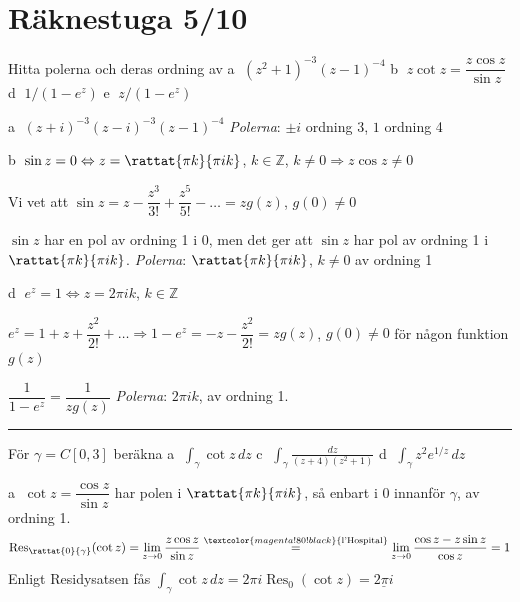 \section{Räknestuga 5/10}

 \quad Hitta polerna och deras ordning av \quad \textcircled{a} $(z^2 + 1)^{-3}(z - 1)^{-4}$ \quad \textcircled{b} $z \cot z = \dfrac{z \cos z}{\sin z}$ \quad \textcircled{d} $1/(1 - e^z)$ \quad \textcircled{e} $z/(1 - e^z)$

\textcircled{a} $(z + i)^{-3}(z - i)^{-3}(z - 1)^{-4}$ \quad \emph{Polerna}: $\pm i$ ordning 3, $1$ ordning 4

\textcircled{b} $\sin z = 0 \Leftrightarrow z = \rattat{\pi k}{\pi ik}$, $k \in \mathbb{Z}$, $k \neq 0 \Rightarrow z \cos z \neq 0$

Vi vet att $\sin z = z - \dfrac{z^3}{3!} + \dfrac{z^5}{5!} - \dots = zg(z)$, $g(0) \neq 0$

$\sin z$ har en pol av ordning 1 i $0$, men det ger att $\sin z$ har pol av ordning 1 i $\rattat{\pi k}{\pi ik}$. \emph{Polerna}: $\rattat{\pi k}{\pi ik}$, $k \neq 0$ av ordning 1

\textcircled{d} $e^z = 1 \Leftrightarrow z = 2\pi ik$, $k \in \mathbb{Z}$

$e^z = 1 + z + \dfrac{z^2}{2!} + \dots \Rightarrow 1 - e^z = -z - \dfrac{z^2}{2!} = zg(z)$, $g(0) \neq 0$ för någon funktion $g(z)$

$\dfrac{1}{1 - e^z} = \dfrac{1}{zg(z)}$ \quad \emph{Polerna}: $2\pi ik$,  av ordning 1.

\noindent\rule{\linewidth}{0.4pt}

 \quad För $\gamma = C[0, 3]$ beräkna \quad \textcircled{a} $\displaystyle\int_\gamma \cot z\,dz$ \quad \textcircled{c} $\displaystyle\int_\gamma \frac{dz}{(z + 4)(z^2 + 1)}$ \quad \textcircled{d} $\displaystyle\int_\gamma z^2 e^{1/z}\,dz$

\textcircled{a} $\cot z = \dfrac{\cos z}{\sin z}$ har polen i $\rattat{\pi k}{\pi ik}$, så enbart i $0$ innanför $\gamma$, av ordning 1.
\[ \operatorname{Res}_{\rattat{0}{\gamma}}(\cot z) = \lim_{z \to 0} \frac{z \cos z}{\sin z} \overset{\textcolor{magenta!80!black}{\text{l'Hospital}}}{=} \lim_{z \to 0} \frac{\cos z - z \sin z}{\cos z} = 1 \]
Enligt Residysatsen fås $\displaystyle\int_\gamma \cot z\,dz = 2\pi i \operatorname{Res}_0(\cot z) = \underline{2\pi i}$

